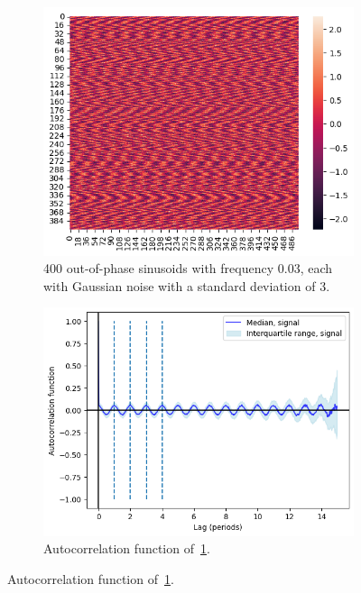 \begin{figure}
  \begin{subfigure}[t]{0.45\textwidth}
  \centering
    \includegraphics[width=\linewidth]{noisysinusoids_outofphase}
    \caption{
      400 out-of-phase sinusoids with frequency 0.03, each with Gaussian noise with a standard deviation of 3.
    }
    \label{fig:acf-sinusoids-gausnoise-ts}
  \end{subfigure}%
  \centering
  \begin{subfigure}[t]{0.45\textwidth}
  \centering
    \includegraphics[width=\linewidth]{verynoisysinusoids_outofphase_acf}
    \caption{
      Autocorrelation function of~\ref{fig:acf-sinusoids-gausnoise-ts}.
    }
    \label{fig:acf-sinusoids-gausnoise-acf}
  \end{subfigure}


\end{figure}
